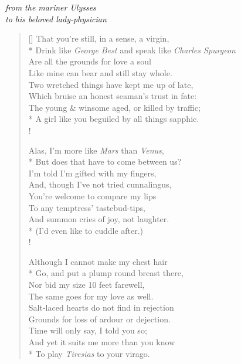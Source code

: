 \begin{center}
    \textit{from the mariner Ulysses}\\
    \textit{to his beloved lady-physician}
\end{center}

\bigskip
\bigskip

\settowidth{\versewidth}{Like mine can bear and still stay whole.}
\begin{verse}[\versewidth]
    That you're still, in a sense, a virgin,\\*
    Drink like \textit{George Best} and speak like \textit{Charles Spurgeon}\\
    Are all the grounds for love a soul\\
    Like mine can bear and still stay whole.\\
    Two wretched things have kept me up of late,\\
    Which bruise an honest seaman's trust in fate:\\
    The young \& winsome aged, or killed by traffic;\\*
    A girl like you beguiled by all things sapphic.\\!

    Alas, I'm more like \textit{Mars} than \textit{Venus},\\*
    But does that have to come between us?\\
    I'm told I'm gifted with my fingers,\\
    And, though I've not tried cunnalingus,\\
    You're welcome to compare my lips\\
    To any temptress' tastebud-tips,\\
    And summon cries of joy, not laughter.\\*
    (I'd even like to cuddle after.)\\!

    Although I cannot make my chest hair\\*
    Go, and put a plump round breast there,\\
    Nor bid my size 10 feet farewell,\\
    The same goes for my love as well.\\
    Salt-laced hearts do not find in rejection\\
    Grounds for loss of ardour or dejection.\\
    Time will only say, I told you so;\\
    And yet it suits me more than you know\\*
    To play \textit{Tiresias} to your virago.
\end{verse}
